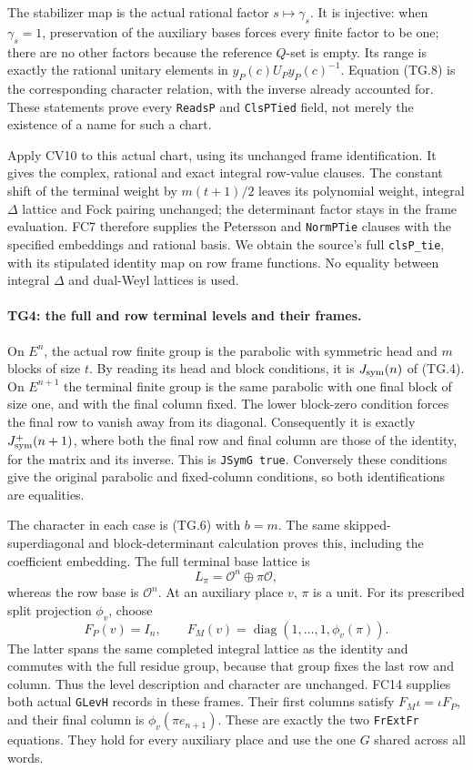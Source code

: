 The stabilizer map is the actual rational factor $s\mapsto\gamma_s$.
It is injective: when $\gamma_s=1$, preservation of the auxiliary
bases forces every finite factor to be one; there are no other
factors because the reference $Q$-set is empty. Its range is
exactly the rational unitary elements in
$y_P(c)U_Py_P(c)^{-1}$. Equation (TG.8) is the corresponding
character relation, with the inverse already accounted for.
These statements prove every \texttt{ReadsP} and
\texttt{ClsPTied} field, not merely the existence of a name for
such a chart.

Apply CV10 to this actual chart, using its unchanged frame
identification. It gives the complex, rational and exact integral
row-value clauses. The constant shift of the terminal weight by
$m(t+1)/2$ leaves its polynomial weight, integral $\Delta$ lattice
and Fock pairing unchanged; the determinant factor stays in the
frame evaluation. FC7 therefore supplies the Petersson and
\texttt{NormPTie} clauses with the specified embeddings and
rational basis. We obtain the source's full
\texttt{clsP\_tie}, with its stipulated identity map on row
frame functions. No equality between integral $\Delta$ and
dual-Weyl lattices is used.

\paragraph{TG4: the full and row terminal levels and their frames.}
On $E^n$, the actual row finite group is the parabolic with
symmetric head and $m$ blocks of size $t$. By reading its
head and block conditions, it is $J_{\rm sym}(n)$ of (TG.4).
On $E^{n+1}$ the terminal finite group is the same parabolic
with one final block of size one, and with the final column
fixed. The lower block-zero condition forces the final row to
vanish away from its diagonal. Consequently it is exactly
$J_{\rm sym}^{+}(n+1)$, where both the final row and final
column are those of the identity, for the matrix and its inverse.
This is \texttt{JSymG true}. Conversely these conditions give
the original parabolic and fixed-column conditions, so both
identifications are equalities.

The character in each case is (TG.6) with $b=m$. The same
skipped-superdiagonal and block-determinant calculation proves
this, including the coefficient embedding. The full terminal
base lattice is
\[
 L_\pi=\mathcal O^n\oplus\pi\mathcal O,
 \tag{TG.9}
\]
whereas the row base is $\mathcal O^n$. At an auxiliary place
$v$, $\pi$ is a unit. For its prescribed split projection
$\phi_v$, choose
\[
 F_P(v)=I_n,\qquad
 F_M(v)=\operatorname{diag}(1,\ldots,1,\phi_v(\pi)).
 \tag{TG.10}
\]
The latter spans the same completed integral lattice as the
identity and commutes with the full residue group, because that
group fixes the last row and column. Thus the level description
and character are unchanged. FC14 supplies both actual
\texttt{GLevH} records in these frames. Their first columns
satisfy $F_M\iota=\iota F_P$, and their final column is
$\phi_v(\pi e_{n+1})$. These are exactly the two
\texttt{FrExtFr} equations. They hold for every auxiliary place
and use the one $G$ shared across all words.

